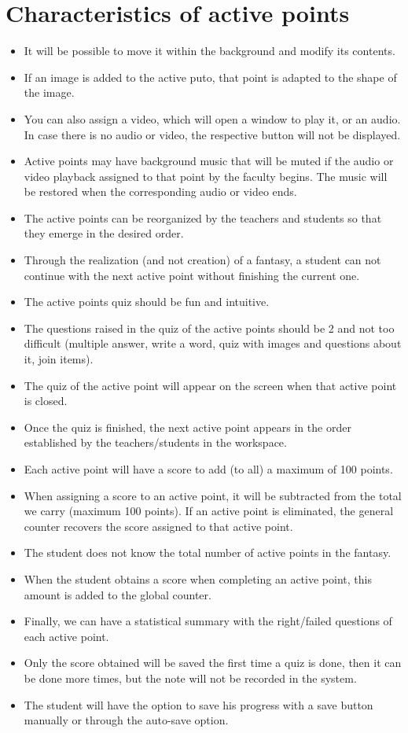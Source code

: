 \section{Characteristics of active points}
\begin{itemize}
	\item It will be possible to move it within the background and modify its contents.
	\item If an image is added to the active puto, that point is adapted to the shape of the image.
	\item You can also assign a video, which will open a window to play it, or an audio. In case there is no audio or video, the respective button will not be displayed.
	\item Active points may have background music that will be muted if the audio or video playback assigned to that point by the faculty begins. The music will be restored when the corresponding audio or video ends.
	\item The active points can be reorganized by the teachers and students so that they emerge in the desired order.
	\item Through the realization (and not creation) of a fantasy, a student can not continue with the next active point without finishing the current one.
	\item The active points quiz should be fun and intuitive.
	\item The questions raised in the quiz of the active points should be 2 and not too difficult (multiple answer, write a word, quiz with images and questions about it, join items).
	\item The quiz of the active point will appear on the screen when that active point is closed.
	\item Once the quiz is finished, the next active point appears in the order established by the teachers/students in the workspace.
	\item Each active point will have a score to add (to all) a maximum of 100 points.
	\item When assigning a score to an active point, it will be subtracted from the total we carry (maximum 100 points). If an active point is eliminated, the general counter recovers the score assigned to that active point.
	\item The student does not know the total number of active points in the fantasy.
	\item When the student obtains a score when completing an active point, this amount is added to the global counter.
	\item Finally, we can have a statistical summary with the right/failed questions of each active point.
	\item Only the score obtained will be saved the first time a quiz is done, then it can be done more times, but the note will not be recorded in the system.
	\item The student will have the option to save his progress with a save button manually or through the auto-save option.
\end{itemize}